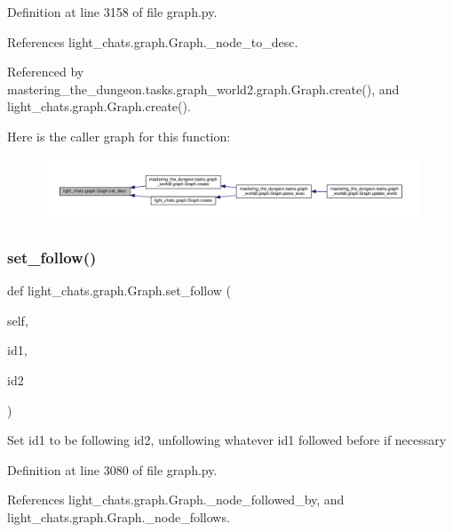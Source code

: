 Definition at line 3158 of file graph.\+py.



References light\+\_\+chats.\+graph.\+Graph.\+\_\+node\+\_\+to\+\_\+desc.



Referenced by mastering\+\_\+the\+\_\+dungeon.\+tasks.\+graph\+\_\+world2.\+graph.\+Graph.\+create(), and light\+\_\+chats.\+graph.\+Graph.\+create().

Here is the caller graph for this function\+:
\nopagebreak
\begin{figure}[H]
\begin{center}
\leavevmode
\includegraphics[width=350pt]{classlight__chats_1_1graph_1_1Graph_a6039eea576e68156be7fcaa7a3929358_icgraph}
\end{center}
\end{figure}
\mbox{\label{classlight__chats_1_1graph_1_1Graph_a729d07bc1da395a60d3431cec5bb439b}} 
\subsubsection{\texorpdfstring{set\+\_\+follow()}{set\_follow()}}
{\footnotesize\ttfamily def light\+\_\+chats.\+graph.\+Graph.\+set\+\_\+follow (\begin{DoxyParamCaption}\item[{}]{self,  }\item[{}]{id1,  }\item[{}]{id2 }\end{DoxyParamCaption})}

\begin{DoxyVerb}Set id1 to be following id2, unfollowing whatever id1 followed
before if necessary
\end{DoxyVerb}
 

Definition at line 3080 of file graph.\+py.



References light\+\_\+chats.\+graph.\+Graph.\+\_\+node\+\_\+followed\+\_\+by, and light\+\_\+chats.\+graph.\+Graph.\+\_\+node\+\_\+follows.



